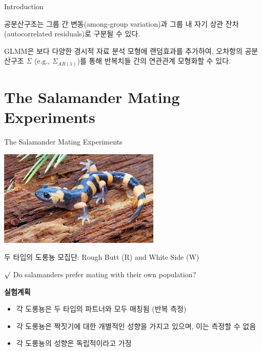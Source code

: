 \documentclass[9pt, xelatex]{beamer}
\begin{document}
{\begin{frame}[allowframebreaks]{Introduction}
\begin{itemize}
			공분산구조는 그룹 간 변동(among-group variation)과 그룹 내 자기 상관 잔차(autocorrelated residuals)로 구분될 수 있다.
			\vspace{2mm}
			
			GLMM은 보다 다양한 경시적 자료 분석 모형에 랜덤효과를 추가하여, 오차항의 공분산구조 $\Sigma$ (e.g., $\Sigma_{AR(1)}$)를 통해 반복치들 간의 연관관계 모형화할 수 있다.
			
		\end{itemize}	
	\end{frame}
}


\section{The Salamander Mating Experiments}{
	\begin{frame}[allowframebreaks]{The Salamander Mating Experiments}
		\begin{center}
			\graphicspath{ {./} }
			\includegraphics[scale=0.6]{sal}
			\vspace{4mm}
			
			두 타입의 도롱뇽 모집단: Rough Butt (R) and White Side (W)
			\vspace{3mm}
			
			$\surd$ Do salamanders prefer mating with their own population?
		\end{center}
		
		
		\framebreak
		
		
		\textbf{실험계획} \\
		\vspace{4mm}
		\begin{itemize}
			\item 각 도롱뇽은 두 타입의 파트너와 모두 매칭됨 (반복 측정)
			\vspace{2mm}
			\item 각 도롱뇽은 짝짓기에 대한 개별적인 성향을 가지고 있으며, 이는 측정할 수 없음
			\vspace{2mm}
			\item 각 도롱뇽의 성향은 독립적이라고 가정
			\vspace{4mm}
			

\end{itemize}
\end{frame}}
\end{document}
